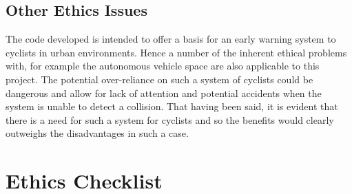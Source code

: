 \documentclass[11pt,twoside]{report}
\begin{document}
\subsection{Other Ethics Issues}

The code developed is intended to offer a basis for an early warning system to cyclists in urban environments. Hence a number of the inherent ethical problems with, for example the autonomous vehicle space are also applicable to this project. The potential over-reliance on such a system of cyclists could be dangerous and allow for lack of attention and potential accidents when the system is unable to detect a collision. That having been said, it is evident that there is a need for such a system for cyclists and so the benefits would clearly outweighs the disadvantages in such a case.

\section{Ethics Checklist}


\end{document}
